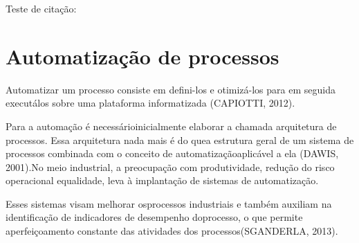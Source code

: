 \vspace{-42pt}
Teste de citação: \cite{DepEngEle}
\section[Automatização de processos]{Automatização de processos}
Automatizar um processo consiste em defini-los e otimizá-los para em seguida executálos sobre uma plataforma informatizada (CAPIOTTI, 2012). 

Para a automação é necessárioinicialmente elaborar a chamada arquitetura de processos. Essa arquitetura nada mais é do quea estrutura geral de um sistema de processos combinada com o conceito de automatizaçãoaplicável a ela (DAWIS, 2001).No meio industrial, a preocupação com produtividade, redução do risco operacional equalidade, leva à implantação de sistemas de automatização. 

Esses sistemas visam melhorar osprocessos industriais e também auxiliam na identificação de indicadores de desempenho doprocesso, o que permite aperfeiçoamento constante das atividades dos processos(SGANDERLA, 2013).